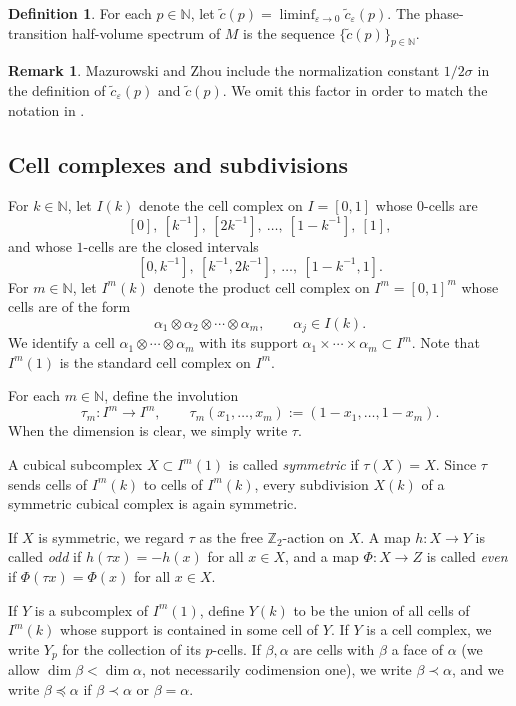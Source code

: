 \documentclass[12pt,english]{article}
\theoremstyle{definition}
\newtheorem{remark}[theorem]{Remark}
\newtheorem{definition}[theorem]{Definition}
\begin{document}
\begin{definition}
For each $p\in \mathbb{N}$, let $\tilde c(p) = \liminf_{\varepsilon\to 0} \tilde c_\varepsilon(p)$. The phase-transition half-volume spectrum of $M$ is the sequence $\{\tilde c(p)\}_{p\in \mathbb{N}}$.
\end{definition}

\begin{remark}
Mazurowski and Zhou \cite{ZhouMazur0} include the normalization constant $1/2\sigma$ in the definition of $\tilde c_\varepsilon(p)$ and $\tilde c(p)$. We omit this factor in order to match the notation in \cite{Dey, GG2}.
\end{remark}
\subsection{Cell complexes and subdivisions}
\label{subsec:cell_complexes}

For $k\in\mathbb{N}$, let $I(k)$ denote the cell complex on $I=[0,1]$ whose $0$-cells are
\[
[0],\ [k^{-1}],\ [2k^{-1}],\ \dots,\ [1-k^{-1}],\ [1],
\]
and whose $1$-cells are the closed intervals
\[
[0,k^{-1}],\ [k^{-1},2k^{-1}],\ \dots,\ [1-k^{-1},1].
\]
For $m\in\mathbb{N}$, let $I^m(k)$ denote the product cell complex on $I^m=[0,1]^m$ whose cells are of the form
\[
\alpha_1\otimes \alpha_2\otimes \cdots \otimes \alpha_m,
\qquad \alpha_j\in I(k).
\]
We identify a cell $\alpha_1\otimes\cdots\otimes\alpha_m$ with its support
$\alpha_1\times\cdots\times\alpha_m\subset I^m$. Note that $I^m(1)$ is the standard cell complex on $I^m$.

For each $m\in\mathbb{N}$, define the involution
\[
\tau_m:I^m\to I^m,
\qquad
\tau_m(x_1,\dots,x_m):=(1-x_1,\dots,1-x_m).
\]
When the dimension is clear, we simply write $\tau$.

A cubical subcomplex $X\subset I^m(1)$ is called \emph{symmetric} if $\tau(X)=X$. Since $\tau$ sends cells of $I^m(k)$ to cells of $I^m(k)$, every subdivision $X(k)$ of a symmetric cubical complex is again symmetric.

If $X$ is symmetric, we regard $\tau$ as the free $\mathbb{Z}_2$-action on $X$.
A map $h:X\to Y$ is called \emph{odd} if $h(\tau x)=-h(x)$ for all $x\in X$, and a map $\Phi:X\to Z$ is called \emph{even} if $\Phi(\tau x)=\Phi(x)$ for all $x\in X$.

If $Y$ is a subcomplex of $I^m(1)$, define $Y(k)$ to be the union of all cells of $I^m(k)$
whose support is contained in some cell of $Y$.
If $Y$ is a cell complex, we write $Y_p$ for the collection of its $p$-cells.
If $\beta,\alpha$ are cells with $\beta$ a face of $\alpha$ (we allow $\dim\beta<\dim\alpha$,
not necessarily codimension one), we write $\beta\prec\alpha$, and we write $\beta\preceq\alpha$
if $\beta\prec\alpha$ or $\beta=\alpha$.
\end{document}
